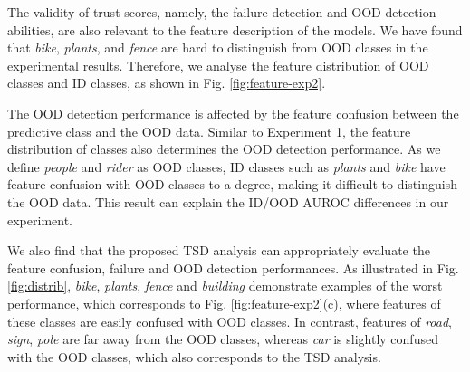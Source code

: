 \documentclass[journal]{IEEEtran}
\begin{document}

The validity of trust scores, namely, the failure detection and OOD detection abilities, are also relevant to the feature description of the models. We have found that \textit{bike}, \textit{plants}, and \textit{fence} are hard to distinguish from OOD classes in the experimental results. Therefore, we analyse the feature distribution of OOD classes and ID classes, as shown in Fig. \ref{fig:feature-exp2}.

The OOD detection performance is affected by the feature confusion between the predictive class and the OOD data. Similar to Experiment 1, the feature distribution of classes also determines the OOD detection performance. As we define \textit{people} and \textit{rider} as OOD classes, ID classes such as \textit{plants} and \textit{bike} have feature confusion with OOD classes to a degree, making it difficult to distinguish the OOD data. This result can explain the ID/OOD AUROC differences in our experiment.

We also find that the proposed TSD analysis can appropriately evaluate the feature confusion, failure and OOD detection performances. As illustrated in Fig. \ref{fig:distrib}, \textit{bike}, \textit{plants}, \textit{fence} and \textit{building} demonstrate examples of the worst performance, which corresponds to Fig. \ref{fig:feature-exp2}(c), where features of these classes are easily confused with OOD classes. In contrast, features of \textit{road}, \textit{sign}, \textit{pole} are far away from the OOD classes, whereas \textit{car} is slightly confused with the OOD classes, which also corresponds to the TSD analysis.
\end{document}
